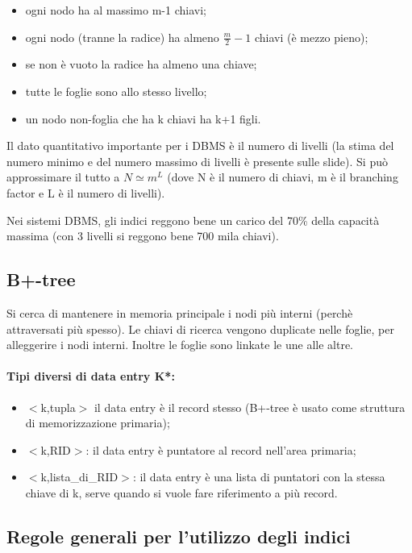 \begin{itemize}
    \item ogni nodo ha al massimo m-1 chiavi;
    \item ogni nodo (tranne la radice) ha almeno $\frac{m}{2}-1$ chiavi (è mezzo pieno);
    \item se non è vuoto la radice ha almeno una chiave;
    \item tutte le foglie sono allo stesso livello;
    \item un nodo non-foglia che ha k chiavi ha k+1 figli.
\end{itemize}

Il dato quantitativo importante per i DBMS è il numero di livelli (la stima del numero minimo e del numero massimo di livelli è presente sulle slide). Si può approssimare il tutto a $N \simeq m^L$ (dove N è il numero di chiavi, m è il branching factor e L è il numero di livelli).

Nei sistemi DBMS, gli indici reggono bene un carico del 70\% della capacità massima (con 3 livelli si reggono bene 700 mila chiavi).

\subsection{B+-tree}

Si cerca di mantenere in memoria principale i nodi più interni (perchè attraversati più spesso). Le chiavi di ricerca vengono duplicate nelle foglie, per alleggerire i nodi interni. Inoltre le foglie sono linkate le une alle altre.

\paragraph{Tipi diversi di data entry K*:}

\begin{itemize}
    \item $<$k,tupla$>$ il data entry è il record stesso (B+-tree è usato come struttura di memorizzazione primaria);
    \item $<$k,RID$>$: il data entry è puntatore al record nell'area primaria;
    \item $<$k,lista\_di\_RID$>$: il data entry è una lista di puntatori con la stessa chiave di k, serve quando si vuole fare riferimento a più record.
\end{itemize}

\subsection{Regole generali per l'utilizzo degli indici}

